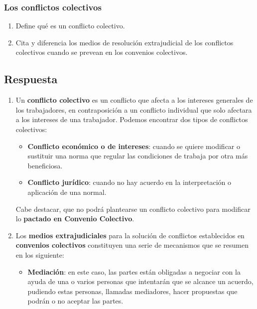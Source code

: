 \subsubsection*{Los conflictos colectivos}

\begin{enumerate}
    \item Define qué es un conflicto colectivo.
    \item Cita y diferencia los medios de  resolución extrajudicial de los conflictos colectivos cuando se prevean en los convenios colectivos.
\end{enumerate}

\subsection{Respuesta}
\begin{enumerate}
    \item Un \textbf{conflicto colectivo} es un conflicto que afecta a los intereses generales de los trabajadores, en contraposición a un conflicto individual que solo afectara a los intereses de una trabajador. Podemos encontrar dos tipos de conflictos colectivos:

    \begin{itemize}
        \item \textbf{Conflicto económico o de intereses}: cuando se quiere modificar o sustituir una norma que regular las condiciones de trabaja por otra más beneficiosa.
        \item \textbf{Conflicto jurídico}: cuando no hay acuerdo en la interpretación o aplicación de una normal.
    \end{itemize}

    Cabe destacar, que no podrá plantearse un conflicto colectivo para modificar lo \textbf{pactado en Convenio Colectivo}. \cite{rd1777}

    \item Los \textbf{medios extrajudiciales} para la solución de conflictos establecidos en \textbf{convenios colectivos} constituyen una serie de mecanismos que se resumen en los siguiente:

    \begin{itemize}
        \item \textbf{Mediación}: en este caso, las partes están obligadas a negociar con la ayuda de una o varios personas  que intentarán que se alcance un acuerdo, pudiendo estas personas, llamadas mediadores, hacer propuestas que podrán o no aceptar las partes.


\end{itemize}
\end{enumerate}
